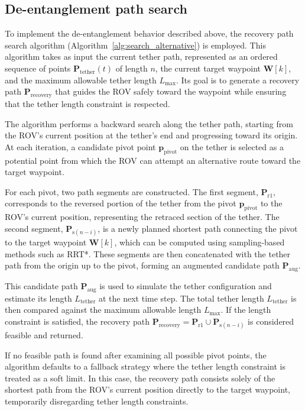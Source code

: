 \subsection{De-entanglement path search}


To implement the de-entanglement behavior described above, the recovery path search algorithm (Algorithm~\ref{alg:search_alternative}) is employed. This algorithm takes as input the current tether path, represented as an ordered sequence of points \(\mathbf{P}_{\mathrm{tether}}(t)\) of length \(n\), the current target waypoint \(\mathbf{W}[k]\), and the maximum allowable tether length \(L_{\max}\). Its goal is to generate a recovery path \(\mathbf{P}_{\mathrm{recovery}}\) that guides the \ac{ROV} safely toward the waypoint while ensuring that the tether length constraint is respected.

The algorithm performs a backward search along the tether path, starting from the \ac{ROV}’s current position at the tether’s end and progressing toward its origin. At each iteration, a candidate pivot point \(\mathbf{p}_{\mathrm{pivot}}\) on the tether is selected as a potential point from which the \ac{ROV} can attempt an alternative route toward the target waypoint.

For each pivot, two path segments are constructed. The first segment, \(\mathbf{P}_{\mathrm{r}1}\), corresponds to the reversed portion of the tether from the pivot \(\mathbf{p}_{\mathrm{pivot}}\) to the \ac{ROV}’s current position, representing the retraced section of the tether. The second segment, \(\mathbf{P}_{\mathrm{s}(n - i)}\), is a newly planned shortest path connecting the pivot to the target waypoint \(\mathbf{W}[k]\), which can be computed using sampling-based methods such as RRT*. These segments are then concatenated with the tether path from the origin up to the pivot, forming an augmented candidate path \(\mathbf{P}_{\mathrm{aug}}\).

This candidate path \(\mathbf{P}_{\mathrm{aug}}\) is used to simulate the tether configuration and estimate its length \(L_{\mathrm{tether}}\) at the next time step. The total tether length \(L_{\mathrm{tether}}\) is then compared against the maximum allowable length \(L_{\max}\). If the length constraint is satisfied, the recovery path \(\mathbf{P}_{\mathrm{recovery}} = \mathbf{P}_{\mathrm{r}1} \cup \mathbf{P}_{\mathrm{s}(n - i)}\) is considered feasible and returned.

If no feasible path is found after examining all possible pivot points, the algorithm defaults to a fallback strategy where the tether length constraint is treated as a soft limit. In this case, the recovery path consists solely of the shortest path from the \ac{ROV}’s current position directly to the target waypoint, temporarily disregarding tether length constraints.

